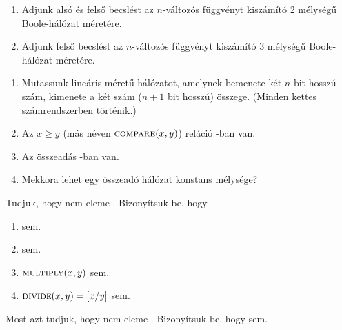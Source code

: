 \begin{Exercise}[counter={sorszam}, difficulty=0]
	\begin{enumerate}
		\item Adjunk alsó és felső becslést az $n$-változós  függvényt kiszámító 2 mélységű Boole-hálózat méretére.
		\item Adjunk felső becslést az $n$-változós  függvényt kiszámító 3 mélységű Boole-hálózat méretére.
	\end{enumerate}
\end{Exercise}


\begin{Exercise}[counter={sorszam}, difficulty=0]
	\begin{enumerate}
		\item Mutassunk lineáris méretű hálózatot, amelynek bemenete két
		$n$ bit hosszú szám, kimenete a két szám ($n+1$ bit hosszú) összege.
		(Minden kettes számrendszerben történik.)
		\item Az $x \geq y$ (más néven $\la{COMPARE}(x,y)$) reláció \ACnull-ban van.
		\item Az összeadás \ACnull-ban van.
		\item \hard Mekkora lehet egy \ACnull összeadó hálózat konstans mélysége?
	\end{enumerate}
\end{Exercise}


\begin{Exercise}[counter={sorszam}, difficulty=0]
\end{Exercise}


\begin{Exercise}[counter={sorszam}, difficulty=0]
	Tudjuk, hogy  nem eleme \ACnull. Bizonyítsuk be, hogy
	\begin{enumerate}
		\item {} sem.
		\item {} sem.
		\item $\la{MULTIPLY}(x,y)$ sem.
		\item $\la{DIVIDE}(x,y)=[x/y]$ sem.
	\end{enumerate}
\end{Exercise}


\begin{Exercise}[counter={sorszam}, difficulty=0]
	Most azt tudjuk, hogy  nem eleme \ACnull. Bizonyítsuk be, hogy  sem.
\end{Exercise}


